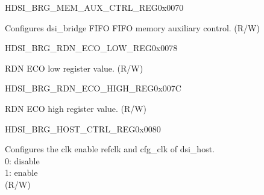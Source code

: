 \begin{register}{H}{DSI\_BRG\_MEM\_AUX\_CTRL\_REG}{0x0070}\label{regdesc:DSIBRGMEMAUXCTRLREG}
%
%
\regnewline%
\begin{regdesc}\begin{reglist}
\label{fielddesc:DSIBRGDSIMEMAUXCTRL}\item [DSI\_BRG\_DSI\_MEM\_AUX\_CTRL] Configures dsi\_bridge FIFO FIFO memory auxiliary control. (R/W)
\end{reglist}\end{regdesc}
\end{register}


\begin{register}{H}{DSI\_BRG\_RDN\_ECO\_LOW\_REG}{0x0078}\label{regdesc:DSIBRGRDNECOLOWREG}
%
\regnewline%
\begin{regdesc}\begin{reglist}
\label{fielddesc:DSIBRGRDNECOLOW}\item [DSI\_BRG\_RDN\_ECO\_LOW] RDN ECO low register value. (R/W)
\end{reglist}\end{regdesc}
\end{register}


\begin{register}{H}{DSI\_BRG\_RDN\_ECO\_HIGH\_REG}{0x007C}\label{regdesc:DSIBRGRDNECOHIGHREG}
%
\regnewline%
\begin{regdesc}\begin{reglist}
\label{fielddesc:DSIBRGRDNECOHIGH}\item [DSI\_BRG\_RDN\_ECO\_HIGH] RDN ECO high register value. (R/W)
\end{reglist}\end{regdesc}
\end{register}


\begin{register}{H}{DSI\_BRG\_HOST\_CTRL\_REG}{0x0080}\label{regdesc:DSIBRGHOSTCTRLREG}
%
%
\regnewline%
\begin{regdesc}\begin{reglist}
\label{fielddesc:DSIBRGDSICFGREFCLKEN}\item [DSI\_BRG\_DSI\_CFG\_REF\_CLK\_EN] Configures the clk enable refclk and cfg\_clk of dsi\_host.\\0: disable\\1: enable\\(R/W)
\end{reglist}\end{regdesc}
\end{register}


